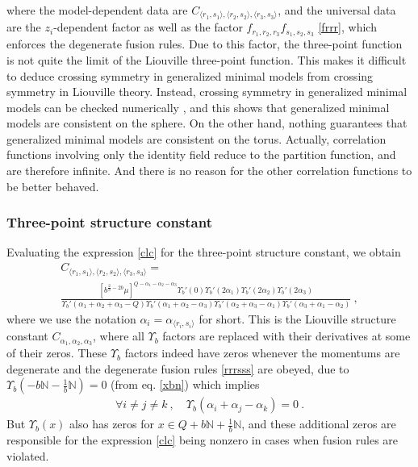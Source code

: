 \documentclass[12pt, a4paper, notitlepage, twoside]{report}
\numberwithin{equation}{section}
\theoremstyle{break}
\begin{document}
where 
the model-dependent data are $C_{\langle r_1,s_1\rangle ,\langle r_2,s_2\rangle ,\langle r_3,s_3 \rangle}$, and the universal data are the $z_i$-dependent factor as well as the factor $f_{r_1,r_2,r_3} f_{s_1,s_2,s_3}$ \eqref{frrr}, which enforces the degenerate fusion rules. 
Due to this factor, the three-point function is not quite the limit of the Liouville three-point function. 
This makes it difficult to deduce crossing symmetry in generalized minimal models from crossing symmetry in Liouville theory. 
Instead, crossing symmetry in generalized minimal models can be checked numerically \cite{rs15}, and this shows that generalized minimal models are consistent on the sphere. 
On the other hand, nothing guarantees that generalized minimal models are consistent on the torus. Actually, correlation functions involving only the identity field reduce to the partition function, and are therefore infinite. And there is no reason for the other correlation functions to be better behaved.  

\subsubsection{Three-point structure constant}

Evaluating the expression \eqref{clc} for the three-point structure constant, we obtain
\begin{multline}
C_{\langle r_1,s_1\rangle ,\langle r_2,s_2\rangle ,\langle r_3,s_3 \rangle} =  
\\
\frac{\left[b^{\frac{2}{b}-2b}\mu\right]^{Q-\alpha_1-\alpha_2-\alpha_3}\Upsilon_b'(0) \Upsilon_b'(2\alpha_1) \Upsilon_b'(2\alpha_2) \Upsilon_b'(2\alpha_3)}{\Upsilon_b'(\alpha_1+\alpha_2+\alpha_3-Q) \Upsilon_b'(\alpha_1+\alpha_2-\alpha_3)\Upsilon_b'(\alpha_2+\alpha_3-\alpha_1)\Upsilon_b'(\alpha_3+\alpha_1-\alpha_2)}\ ,
\label{crisi}
\end{multline}
where we use the notation $\alpha_i = \alpha_{\langle r_i,s_i \rangle}$ for short.
This is the Liouville structure constant $C_{\alpha_1,\alpha_2,\alpha_3}$, where all $\Upsilon_b$ factors are replaced with their derivatives at some of their zeros.
These $\Upsilon_b$ factors indeed have zeros whenever
the momentums are degenerate and the degenerate fusion rules \eqref{rrrsss} are obeyed, due to $\Upsilon_b(-b{\mathbb{N}}-\frac{1}{b}{\mathbb{N}})=0$ (from eq. \eqref{xbn}) which implies 
\begin{align}
 \forall i\neq j\neq k\ , \quad \Upsilon_b(\alpha_i+\alpha_j-\alpha_k) = 0\ .
\end{align}
But $\Upsilon_b(x)$ also has zeros for $x\in Q+b{\mathbb{N}}+\frac{1}{b}{\mathbb{N}}$, and these additional zeros are responsible for the expression \eqref{clc} being nonzero in cases when fusion rules are violated.
\end{document}
